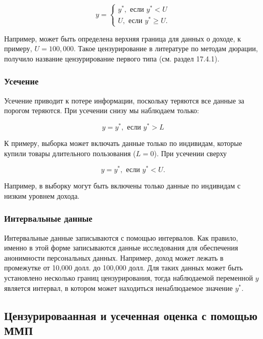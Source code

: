 \begin{equation}
y=
	\begin{cases}
	y^* ,	 \text{ если }y^* <U\\
	U,		\text{ если }y^*  \geq U.
	\end{cases}
\end{equation}

Например, может быть определена верхняя граница для данных о доходе, к примеру, $U=100,000$. Такое цензурирование в литературе по методам дюрации, получило название цензурирование первого типа (см. раздел 17.4.1). 


\subsubsection*{Усечение}

Усечение приводит к потере информации, поскольку теряются все данные за порогом теряются. При усечении снизу мы наблюдаем только:

\begin{equation}
y=y^* , \text{ если } y^* >L
\end{equation}

К примеру, выборка может включать данные только по индивидам, которые купили товары длительного пользования ($L=0$). При усечении сверху

\begin{equation}
y=y^* , \text{ если } y^* <U.
\end{equation}

Например, в выборку могут быть включены только данные по индивидам с низким уровнем дохода.

\subsubsection*{Интервальные данные}

Интервальные данные записываются с помощью интервалов. Как правило, именно в этой форме записываются данные исследования для обеспечения анонимности персональных данных. Например, доход может лежать в промежутке от 10,000 долл. до 100,000 долл. Для таких данных может быть установлено несколько границ цензурирования, тогда наблюдаемой переменной $y$ является интервал, в котором может находиться ненаблюдаемое значение $y^* $. 

\subsection{Цензурироваанная и усеченная оценка с помощью ММП}

